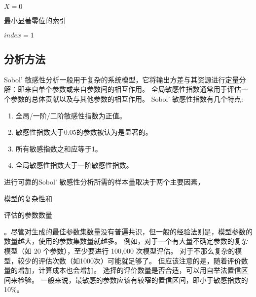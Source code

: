\begin{algorithm}
{{{                
            }
        }
        $X = 0$\\
    }
\end{algorithm}

\begin{algorithm}
    \caption{最小显著零位的索引}
    $index = 1$\\
\end{algorithm}


\subsection{分析方法}

Sobol' 敏感性分析一般用于复杂的系统模型，它将输出方差与其资源进行定量分解：即来自单个参数或来自参数间的相互作用。%
全局敏感性指数通常用于评估一个参数的总体贡献以及与其他参数的相互作用。%
Sobol' 敏感性指数有几个特点:
\begin{enumerate}
    \item 全局/一阶/二阶敏感性指数为正值。
    \item 敏感性指数大于0.05的参数被认为是显著的。
    \item 所有敏感指数之和应等于1。
    \item 全局敏感性指数大于一阶敏感性指数。
\end{enumerate}

进行可靠的Sobol' 敏感性分析所需的样本量取决于两个主要因素，\begin{enumerate*}
    \item 模型的复杂性和
    \item 评估的参数数量
\end{enumerate*} 。尽管对生成的最佳参数集数量没有普遍共识，但一般的经验法则是，模型参数的数量越大，使用的参数集数量就越多。%
例如，对于一个有大量不确定参数的复杂模型（如 20 个参数），至少要进行 100,000 次模型评估。%
对于不那么复杂的模型，较少的评估次数（如1000次）可能就足够了。%
但应该注意的是，随着评价数量的增加，计算成本也会增加。%
选择的评价数量是否合适，可以用自举法置信区间来检验。%
一般来说，最敏感的参数应该有较窄的置信区间，即小于敏感指数的10\%。

